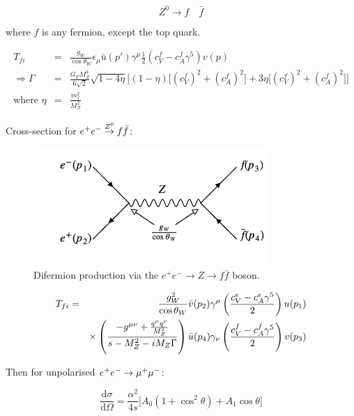 \[
  Z^0 \to f \quad \bar{f}
\]

where $f$ is any fermion, except the top quark.

\begin{eqnarray*}
  T_{fi} & = & \frac{g_W}{\cos\theta_W}\epsilon_{\mu}\bar{u}(p')\gamma^{\mu}\frac{1}{2}\left(c^f_V - c^f_A\gamma^5\right)v(p)\\
  \Rightarrow \Gamma & = & \frac{G_F M^3_Z}{6\sqrt{2}}\sqrt{1 - 4\eta}\Bigg[\left(1 - \eta\right)\Big[\left(c^f_V\right)^2 + \left(c^f_A\right)^2\Big] + 3\eta\Big[\left(c^f_V\right)^2 + \left(c^f_A\right)^2\Big]\Bigg] \\
  \textrm{where } \eta & = & \frac{m_f^2}{M^2_Z}
\end{eqnarray*}

Cross-section for $e^+e^- \stackrel{Z^0}{\to} f\bar{f}$:

\begin{figure}[!htb]
  \begin{center}
    \includegraphics[width=0.8\textwidth]{images/web_feynman/image_58.png}
    \caption[Difermion production via the $Z$ boson]{Difermion production via the $e^+e^-\to Z\to f\bar{f}$ boson.}
    \label{fig:ch13_EEToZToFF}
  \end{center}
\end{figure}

\begin{eqnarray*}
  T_{fi} & = & \frac{g_W^2}{\cos\theta_W}\bar{v}(p_2)\gamma^{\mu}\left(\frac{c^{e}_V - c^{e}_A\gamma^5}{2}\right)u(p_1) \\
  & & \times \left(\frac{-g^{\mu\nu} + \frac{q^{\mu}q^{\nu}}{M^2_Z}}{s - M^2_Z - iM_Z\Gamma}\right)\bar{u}(p_4)\gamma_{\nu}\left(\frac{c^f_V - c^f_A\gamma^5}{2}\right)v(p_3)
\end{eqnarray*}

Then for unpolarised $e^+e^- \to \mu^+\mu^-$:

\[
  \frac{\mathrm{d}\sigma}{\mathrm{d}\Omega} = \frac{\alpha^2}{4s}\Big[A_0\left(1 + \cos^2\theta\right) + A_1\cos\theta\Big]
\]


